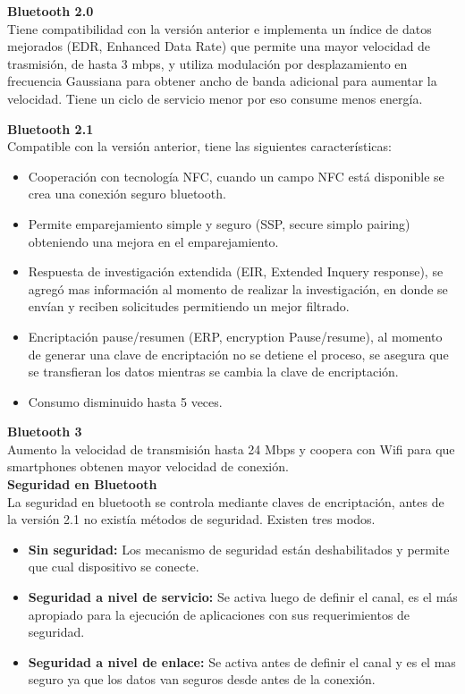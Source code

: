 \documentclass[11pt,openany]{book}
\newcounter{ns}
\begin{document}
		\textbf{Bluetooth 2.0}\\
		Tiene compatibilidad con la versión anterior e implementa un índice de datos mejorados (EDR, Enhanced Data Rate) que permite una mayor velocidad de trasmisión, de hasta 3 mbps, y utiliza modulación por desplazamiento en frecuencia Gaussiana para obtener ancho de banda adicional para aumentar la velocidad. Tiene un ciclo de servicio menor por eso consume menos energía.

		\textbf{Bluetooth 2.1}\\
		Compatible con la versión anterior, tiene las siguientes características:\\
		\begin{itemize}
			\item Cooperación con tecnología NFC, cuando un campo NFC está disponible se crea una conexión seguro bluetooth.
			\item Permite emparejamiento simple y seguro (SSP, secure simplo pairing) obteniendo una mejora en el emparejamiento.
			\item Respuesta de investigación extendida (EIR, Extended Inquery response), se agregó mas información al momento de realizar la investigación, en donde se envían y reciben solicitudes permitiendo un mejor filtrado.
			\item Encriptación pause/resumen (ERP, encryption Pause/resume), al momento de generar una clave de encriptación no se detiene el proceso, se asegura que se transfieran los datos mientras se cambia la clave de encriptación.
			\item Consumo disminuido hasta 5 veces.
		\end{itemize}
		\textbf{ Bluetooth 3}\\
		Aumento la velocidad de transmisión hasta 24 Mbps y coopera con Wifi para que smartphones obtenen mayor velocidad de conexión.\\

		\textbf{Seguridad en Bluetooth \cite{Cherrez2010}}\\
		La seguridad en bluetooth se controla mediante claves de encriptación, antes de la versión 2.1 no existía métodos de seguridad. Existen tres modos.	
		\begin{itemize}	
			\item \textbf{Sin seguridad: }Los mecanismo de seguridad están deshabilitados y permite que cual dispositivo se conecte.
			\item \textbf{Seguridad a nivel de servicio: }Se activa luego de definir el canal, es el más apropiado para la ejecución de aplicaciones con sus requerimientos de seguridad.
			\item \textbf{Seguridad a nivel de enlace: }Se activa antes de definir el canal y es el mas seguro ya que los datos van seguros desde antes de la conexión.
		\end{itemize}
\end{document}
